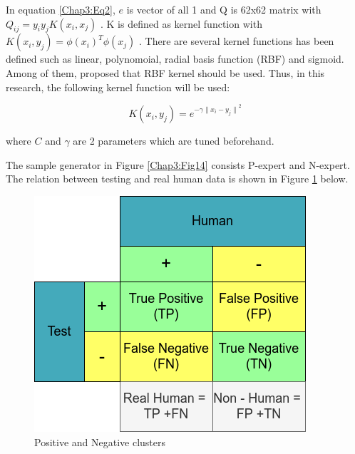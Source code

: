 In equation \ref{Chap3:Eq2}, $e$ is vector of all 1 and Q is 62x62 matrix with
$Q_{ij} = y_i y_j K(x_i,x_j)$ . K is defined as kernel function with  $K(x_i,y_j) = {\phi (x_i)}^T \phi (x_j)$ \cite{libsvm,guide_svm}.
There are several kernel functions has been defined such as linear, polynomoial, radial basis function (RBF)
and sigmoid. Among of them, \cite{guide_svm} proposed that RBF kernel should be used. Thus, in
this research, the following kernel function will be used:

\begin{equation}
    K(x_i,y_j) = e^{- \gamma {\|x_i -y_j \|}^2}
\end{equation}

where $C$ and $\gamma$ are 2 parameters which are tuned beforehand.

The sample generator in Figure \ref{Chap3:Fig14} consists P-expert and N-expert. The relation between testing and
real human data is shown in Figure \ref{Chap3:Fig16} below.


\begin{figure}[h]
    \centering
    \includegraphics[scale=0.7]{figures/chap3_fig/onlineSVM/TN_FN.png}
    \caption{Positive and Negative clusters}
    \label{Chap3:Fig16}
\end{figure}


